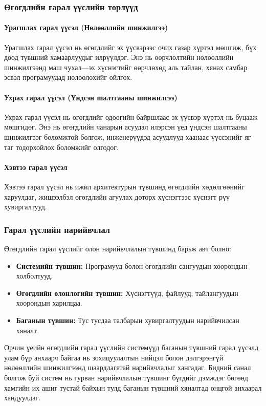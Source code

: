 \subsubsection{Өгөгдлийн гарал үүслийн төрлүүд}

\paragraph{Урагшлах гарал үүсэл (Нөлөөллийн шинжилгээ)}
Урагшлах гарал үүсэл нь өгөгдлийг эх үүсвэрээс очих газар хүртэл мөшгиж, бүх доод түвшний хамаарлуудыг илрүүлдэг. Энэ нь өөрчлөлтийн нөлөөллийн шинжилгээнд маш чухал---эх хүснэгтийг өөрчлөхөд аль тайлан, хянах самбар эсвэл програмуудад нөлөөлөхийг ойлгох.

\paragraph{Ухрах гарал үүсэл (Үндсэн шалтгааны шинжилгээ)}
Ухрах гарал үүсэл нь өгөгдлийг одоогийн байршлаас эх үүсвэр хүртэл нь буцааж мөшгидөг. Энэ нь өгөгдлийн чанарын асуудал илэрсэн үед үндсэн шалтгааны шинжилгээг боломжтой болгож, инженерүүдэд асуудлууд хаанаас үүссэнийг яг таг тодорхойлох боломжийг олгодог.

\paragraph{Хэвтээ гарал үүсэл}
Хэвтээ гарал үүсэл нь ижил архитектурын түвшинд өгөгдлийн хөдөлгөөнийг харуулдаг, жишээлбэл өгөгдлийн агуулах доторх хүснэгтээс хүснэгт рүү хувиргалтууд.

\subsubsection{Гарал үүслийн нарийвчлал}

Өгөгдлийн гарал үүслийг олон нарийвчлалын түвшинд барьж авч болно:

\begin{itemize}
    \item \textbf{Системийн түвшин:} Програмууд болон өгөгдлийн сангуудын хоорондын холболтууд.
    \item \textbf{Өгөгдлийн олонлогийн түвшин:} Хүснэгтүүд, файлууд, тайлангуудын хоорондын харилцаа.
    \item \textbf{Баганын түвшин:} Тус тусдаа талбарын хувиргалтуудын нарийвчилсан хяналт.
\end{itemize}

Орчин үеийн өгөгдлийн гарал үүслийн системүүд баганын түвшний гарал үүсэлд улам бүр анхаарч байгаа нь зохицуулалтын нийцэл болон дэлгэрэнгүй нөлөөллийн шинжилгээнд шаардлагатай нарийвчлалыг хангадаг. Бидний санал болгож буй систем нь гурван нарийвчлалын түвшинг бүгдийг дэмждэг бөгөөд хамгийн их ашиг тустай байхын тулд баганын түвшний хяналтад онцгой анхаарал хандуулдаг.

